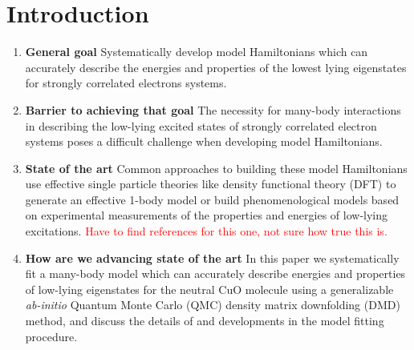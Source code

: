 \documentclass{article}
\begin{document}
\section{Introduction}
\begin{enumerate}
\item \textbf{General goal}
Systematically develop model Hamiltonians which can accurately describe the energies and properties of the lowest lying eigenstates for strongly correlated electrons systems.

\item \textbf{Barrier to achieving that goal} The necessity for many-body interactions in describing the low-lying excited states of strongly correlated electron systems poses a difficult challenge when developing model Hamiltonians.

\item \textbf{State of the art} Common approaches to building these model Hamiltonians use effective single particle theories like density functional theory (DFT) to generate an effective 1-body model or build phenomenological models based on experimental measurements of the properties and energies of low-lying excitations.
\textcolor{red}{Have to find references for this one, not sure how true this is.}

\item\textbf{How are we advancing state of the art} In this paper we systematically fit a many-body model which can accurately describe energies and properties of low-lying eigenstates for the neutral CuO molecule using a generalizable \textit{ab-initio} Quantum Monte Carlo (QMC) density matrix downfolding (DMD) method, and discuss the details of and developments in the model fitting procedure.
\end{enumerate}
\end{document}

